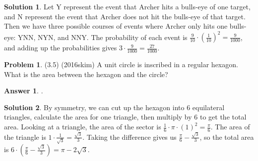 \documentclass{article}
\theoremstyle{definition}
\newtheorem{problem}{Problem}
\newtheorem*{solution}{Solution}
\newtheorem*{answer}{Answer}
\begin{document}
\begin{solution}
Let Y represent the event that Archer hits a bulls-eye of one target, and N represent the event that Archer does not hit the bulls-eye of that target. Then we have three possible courses of events where Archer only hits one bulls-eye: YNN, NYN, and NNY. The probability of each event is $\frac{9}{10}\cdot(\frac{1}{10})^2 = \frac{9}{1000}$, and adding up the probabilities gives $3\cdot\frac{9}{1000} = \boxed{\frac{27}{1000}}$.
\end{solution}

\begin{problem}
(3.5) (2016skim) A unit circle is inscribed in a regular hexagon. What is the area between the hexagon and the circle?
\end{problem}

\begin{answer}
.
\end{answer}

\begin{solution}
By symmetry, we can cut up the hexagon into 6 equilateral triangles, calculate the area for one triangle, then multiply by 6 to get the total area. Looking at a triangle, the area of the sector is $\frac{1}{6}\cdot\pi\cdot(1)^2 = \frac{\pi}{6}$. The area of the triangle is $1\cdot\frac{1}{\sqrt{3}} = \frac{\sqrt{3}}{3}$. Taking the difference gives us $\frac{\pi}{6} - \frac{\sqrt{3}}{3}$, so the total area is $6\cdot(\frac{\pi}{6} - \frac{\sqrt{3}}{3}) = \boxed{\pi - 2\sqrt{3}}$.
\end{solution}
\end{document}
